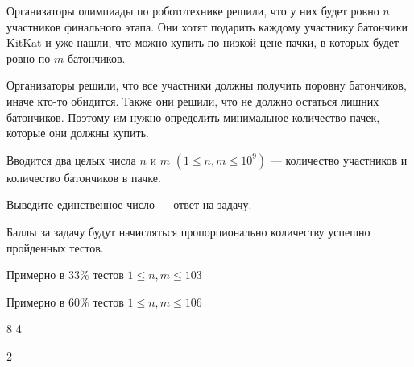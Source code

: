 
Организаторы олимпиады по робототехнике решили, что у них будет ровно $n$ участников финального этапа. 
Они хотят подарить каждому участнику батончики KitKat и уже нашли, что можно купить по низкой цене пачки, 
в которых будет ровно по $m$ батончиков.

Организаторы решили, что все участники должны получить поровну батончиков, иначе кто-то обидится. 
Также они решили, что не должно остаться лишних батончиков. Поэтому им нужно определить минимальное 
количество пачек, которые они должны купить.


Вводится два целых числа $n$ и $m$ $(1 \leq n,m \leq 10^9)$ — количество участников и количество батончиков в пачке.

\outputfmtSection

Выведите единственное число — ответ на задачу.

\markSection

Баллы за задачу будут начисляться пропорционально количеству успешно пройденных тестов. 

Примерно в $33\%$ тестов $1 \leq n,m \leq 103$ 

Примерно в $60\%$ тестов $1 \leq n,m \leq 106$




\begin{myverbbox}[\small]{\vinput}
    8 4
\end{myverbbox}
\begin{myverbbox}[\small]{\voutput}
    2
\end{myverbbox}


